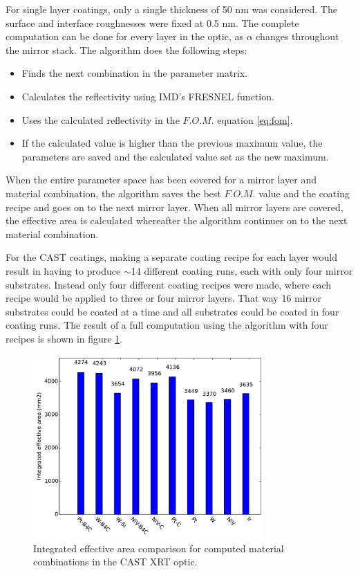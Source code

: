 For single layer coatings, only a single thickness of 50 nm was considered. The surface and interface roughnesses were fixed at 0.5 nm. The complete computation can be done for every layer in the optic, as $\alpha$ changes throughout the mirror stack. The algorithm does the following steps:
\begin{itemize}
  \item[\bf 1] Finds the next combination in the parameter matrix.
  \item[\bf 2] Calculates the reflectivity using IMD's FRESNEL function.
  \item[\bf 3] Uses the calculated reflectivity in the $F.O.M.$ equation \ref{eq:fom}.
  \item[\bf 4] If the calculated value is higher than the previous maximum value, the parameters are saved and the calculated value set as the new maximum.
\end{itemize}

When the entire parameter space has been covered for a mirror layer and material combination, the algorithm saves the best $F.O.M.$ value and the coating recipe and goes on to the next mirror layer. When all mirror layers are covered, the effective area is calculated whereafter the algorithm continues on to the next material combination.

For the CAST coatings, making a separate coating recipe for each layer would result in having to produce $\sim$14 different coating runs, each with only four mirror substrates. Instead only four different coating recipes were made, where each recipe would be applied to three or four mirror layers. That way 16 mirror substrates could be coated at a time and all substrates could be coated in four coating runs. The result of a full computation using the algorithm with four recipes is shown in figure \ref{fig:mat_result}.

\begin{figure}[htbp]
  \centering
    \includegraphics[height=7cm]{figures/cast/mat_result.pdf}
  \caption{\footnotesize Integrated effective area comparison for computed material combinations in the CAST XRT optic. }
  \label{fig:mat_result}
\end{figure}

